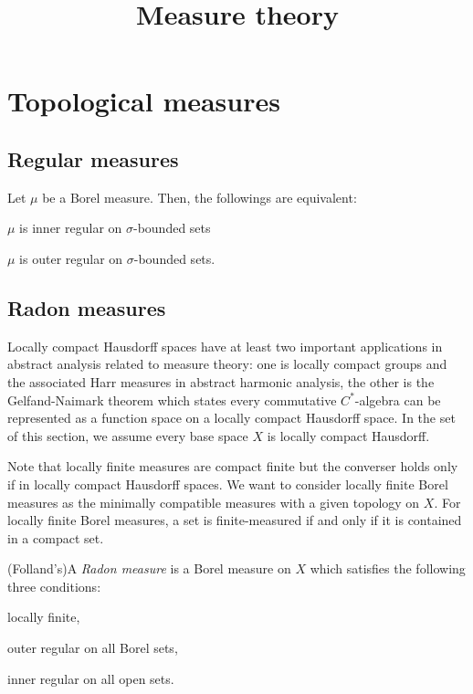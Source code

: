 \documentclass{../exp}
\title{Measure theory}
\begin{document}
\maketitle



\section{Topological measures}

\subsection{Regular measures}

\begin{thm}
Let $\mu$ be a Borel measure.
Then, the followings are equivalent:
\begin{cond}
\item$\mu$ is inner regular on $\sigma$-bounded sets
\item $\mu$ is outer regular on $\sigma$-bounded sets.
\end{cond}
\end{thm}



\subsection{Radon measures}

Locally compact Hausdorff spaces have at least two important applications in abstract analysis related to measure theory: one is locally compact groups and the associated Harr measures in abstract harmonic analysis, the other is the Gelfand-Naimark theorem which states every commutative $C^*$-algebra can be represented as a function space on a locally compact Hausdorff space.
In the set of this section, we assume every base space $X$ is locally compact Hausdorff.

Note that locally finite measures are compact finite but the converser holds only if in locally compact Hausdorff spaces.
We want to consider locally finite Borel measures as the minimally compatible measures with a given topology on $X$.
For locally finite Borel measures, a set is finite-measured if and only if it is contained in a compact set.
\begin{defn}
(Folland's)A \emph{Radon measure} is a Borel measure on $X$ which satisfies the following three conditions:
\begin{cond}
\item locally finite,
\item outer regular on all Borel sets,
\item inner regular on all open sets.
\end{cond}
\end{defn}
\end{document}
